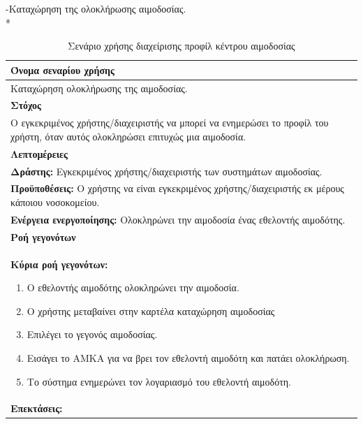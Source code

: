 -Καταχώρηση της ολοκλήρωσης αιμοδοσίας.
\\*	

\begin{table}[H]
	\begin{center}
	    \begin{tabular}{|p{\dimexpr \linewidth-2\tabcolsep}|}
	    \hline
	    \rowcolor{grayy}
	    \textbf{Όνομα σεναρίου χρήσης}
	    \\ \hline    
	    Καταχώρηση ολοκλήρωσης της αιμοδοσίας.
	     \\ \hline
	    \rowcolor{grayy}
	    \textbf{\textbf{Στόχος}}
	    \\ \hline
	 	 Ο εγκεκριμένος χρήστης/διαχειριστής να μπορεί να ενημερώσει το προφίλ του χρήστη, όταν αυτός ολοκληρώσει επιτυχώς μια αιμοδοσία.
	    \\ \hline
	    \rowcolor{grayy}
	    \textbf{Λεπτομέρειες}
	    \\ \hline
		\textbf{Δράστης:} Εγκεκριμένος χρήστης/διαχειριστής των συστημάτων αιμοδοσίας.
		\\*
		\textbf{Προϋποθέσεις:} Ο χρήστης να είναι εγκεκριμένος χρήστης/διαχειριστής εκ μέρους κάποιου νοσοκομείου.
		\\
		\textbf{Ενέργεια ενεργοποίησης:} Ολοκληρώνει την αιμοδοσία ένας εθελοντής αιμοδότης.
	    \\ \hline
		\rowcolor{grayy}    
	    \textbf{Ροή γεγονότων}
	    \\ \hline
		\textbf{Κύρια ροή γεγονότων:}
		\begin{enumerate}
			\item	 Ο εθελοντής αιμοδότης ολοκληρώνει την αιμοδοσία.
			\item Ο χρήστης μεταβαίνει στην καρτέλα καταχώρηση αιμοδοσίας
			\item Επιλέγει το γεγονός αιμοδοσίας.
			\item Εισάγει το ΑΜΚΑ για να βρει τον εθελοντή αιμοδότη και πατάει ολοκλήρωση.
			\item Το σύστημα ενημερώνει τον λογαριασμό του εθελοντή αιμοδότη.
		\end{enumerate}
		\\ \hline
		\textbf{Επεκτάσεις:}
		   \\ \hline
	    \end{tabular}
	    \caption{Σενάριο χρήσης διαχείρισης προφίλ κέντρου αιμοδοσίας}
	    \label{tab:add_completed_blood_donation}
	\end{center}
\end{table}	


